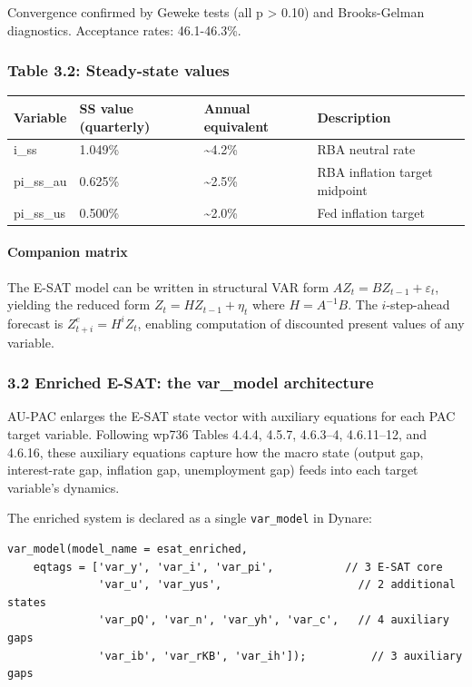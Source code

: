 \documentclass[
]{article}
\newcounter{none} %
\begin{document}
Convergence confirmed by Geweke tests (all p \textgreater{} 0.10) and
Brooks-Gelman diagnostics. Acceptance rates: 46.1-46.3\%.

\subsubsection{Table 3.2: Steady-state
values}\label{table-3.2-steady-state-values}

{\def\LTcaptype{none} %
\begin{longtable}[]{@{}llll@{}}
\toprule\noalign{}
Variable & SS value (quarterly) & Annual equivalent & Description \\
\midrule\noalign{}
\endhead
\bottomrule\noalign{}
\endlastfoot
i\_ss & 1.049\% & \textasciitilde4.2\% & RBA neutral rate \\
pi\_ss\_au & 0.625\% & \textasciitilde2.5\% & RBA inflation target
midpoint \\
pi\_ss\_us & 0.500\% & \textasciitilde2.0\% & Fed inflation target \\
\end{longtable}
}

\paragraph{Companion matrix}\label{companion-matrix}

The E-SAT model can be written in structural VAR form
\(AZ_t = BZ_{t-1} + \varepsilon_t\), yielding the reduced form
\(Z_t = HZ_{t-1} + \eta_t\) where \(H = A^{-1}B\). The \(i\)-step-ahead
forecast is \(Z^e_{t+i} = H^i Z_t\), enabling computation of discounted
present values of any variable.

\subsubsection{3.2 Enriched E-SAT: the var\_model
architecture}\label{enriched-e-sat-the-var_model-architecture}

AU-PAC enlarges the E-SAT state vector with auxiliary equations for each
PAC target variable. Following wp736 Tables 4.4.4, 4.5.7, 4.6.3--4,
4.6.11--12, and 4.6.16, these auxiliary equations capture how the macro
state (output gap, interest-rate gap, inflation gap, unemployment gap)
feeds into each target variable's dynamics.

The enriched system is declared as a single \texttt{var\_model} in
Dynare:

\begin{verbatim}
var_model(model_name = esat_enriched,
    eqtags = ['var_y', 'var_i', 'var_pi',           // 3 E-SAT core
              'var_u', 'var_yus',                     // 2 additional states
              'var_pQ', 'var_n', 'var_yh', 'var_c',   // 4 auxiliary gaps
              'var_ib', 'var_rKB', 'var_ih']);          // 3 auxiliary gaps
\end{verbatim}
\end{document}
